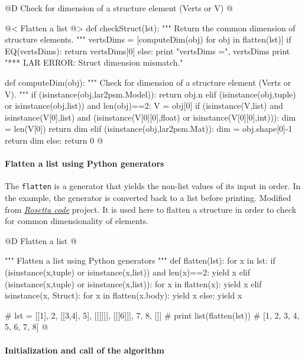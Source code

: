 \documentclass[11pt,oneside]{article}	%
\begin{document}
@D Check for dimension of a structure element (Verts or V)
@{@< Flatten a list @>
def checkStruct(lst):
	""" Return the common dimension of structure elements.
	"""
	vertsDims = [computeDim(obj) for obj in flatten(lst)]
	if EQ(vertsDims): 
		return vertsDims[0]
	else: 
		print "\n vertsDims =", vertsDims
		print "*** LAR ERROR: Struct dimension mismatch."

def computeDim(obj):
	""" Check for dimension of a structure element (Verts or V). 
	"""
	if (isinstance(obj,lar2psm.Model)):
		return obj.n
	elif (isinstance(obj,tuple) or isinstance(obj,list)) and len(obj)==2:
		V = obj[0]
		if (isinstance(V,list) and isinstance(V[0],list) and 
				(isinstance(V[0][0],float) or isinstance(V[0][0],int))): 
			dim = len(V[0])
			return dim
	elif (isinstance(obj,lar2psm.Mat)):
		dim = obj.shape[0]-1
		return dim
	else: return 0
@}

\paragraph{Flatten a list using Python generators}
The \texttt{flatten} is a generator that yields the non-list values of its input in order. In the example, the generator is converted back to a list before printing. Modified from \href{http://rosettacode.org/wiki/Flatten_a_list#Python}{\emph{Rosetta code}} project. It is used here to flatten a structure in order to check for common dimensionality of elements.

@D Flatten a list
@{""" Flatten a list using Python generators """
def flatten(lst):
	for x in lst:
		if (isinstance(x,tuple) or isinstance(x,list)) and len(x)==2:
			yield x
		elif (isinstance(x,tuple) or isinstance(x,list)):
			for x in flatten(x):
				yield x
		elif isinstance(x, Struct):
			for x in flatten(x.body):
				yield x
		else:
			yield x
 
# lst = [[1], 2, [[3,4], 5], [[[]]], [[[6]]], 7, 8, []]
# print list(flatten(lst)) 
# [1, 2, 3, 4, 5, 6, 7, 8]
@}

\paragraph{Initialization and call of the algorithm}
\end{document}

